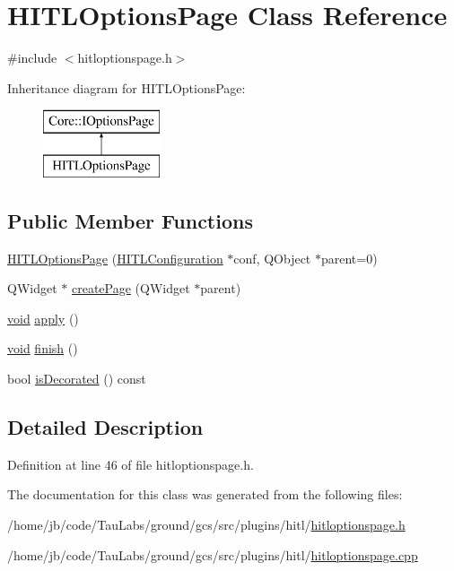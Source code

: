 \hypertarget{class_h_i_t_l_options_page}{\section{\-H\-I\-T\-L\-Options\-Page \-Class \-Reference}
\label{class_h_i_t_l_options_page}
}


{\ttfamily \#include $<$hitloptionspage.\-h$>$}

\-Inheritance diagram for \-H\-I\-T\-L\-Options\-Page\-:\begin{figure}[H]
\begin{center}
\leavevmode
\includegraphics[height=2.000000cm]{class_h_i_t_l_options_page}
\end{center}
\end{figure}
\subsection*{\-Public \-Member \-Functions}
\begin{DoxyCompactItemize}
\item 
\hyperlink{group___h_i_t_l_plugin_ga6f316a1c3e3ee76ad5d8931dbc861194}{\-H\-I\-T\-L\-Options\-Page} (\hyperlink{class_h_i_t_l_configuration}{\-H\-I\-T\-L\-Configuration} $\ast$conf, \-Q\-Object $\ast$parent=0)
\item 
\-Q\-Widget $\ast$ \hyperlink{group___h_i_t_l_plugin_ga82b1534b1cdc2ad63d8849636f64b8c9}{create\-Page} (\-Q\-Widget $\ast$parent)
\item 
\hyperlink{group___u_a_v_objects_plugin_ga444cf2ff3f0ecbe028adce838d373f5c}{void} \hyperlink{group___h_i_t_l_plugin_ga6554b77636be9ff76148c91411929d4a}{apply} ()
\item 
\hyperlink{group___u_a_v_objects_plugin_ga444cf2ff3f0ecbe028adce838d373f5c}{void} \hyperlink{group___h_i_t_l_plugin_ga2a1b2e14f1c4d4cd1c5f63c1c906f06d}{finish} ()
\item 
bool \hyperlink{group___h_i_t_l_plugin_ga0f6209b81c7a24419e848b6740d72f24}{is\-Decorated} () const 
\end{DoxyCompactItemize}


\subsection{\-Detailed \-Description}


\-Definition at line 46 of file hitloptionspage.\-h.



\-The documentation for this class was generated from the following files\-:\begin{DoxyCompactItemize}
\item 
/home/jb/code/\-Tau\-Labs/ground/gcs/src/plugins/hitl/\hyperlink{hitloptionspage_8h}{hitloptionspage.\-h}\item 
/home/jb/code/\-Tau\-Labs/ground/gcs/src/plugins/hitl/\hyperlink{hitloptionspage_8cpp}{hitloptionspage.\-cpp}\end{DoxyCompactItemize}

